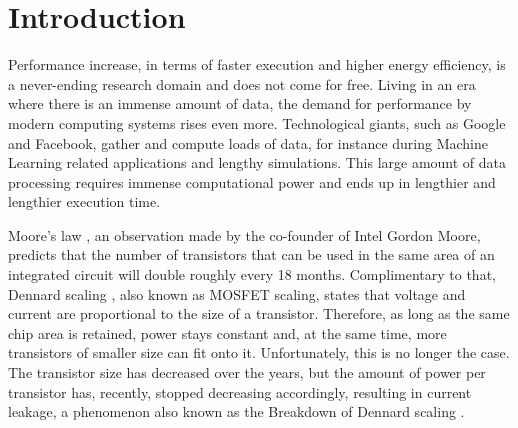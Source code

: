 \documentclass[]{usiinfthesis}
\begin{document}
\tableofcontents 

\mainmatter

%
%
%  
%
%
%

\chapter*{Introduction}

Performance increase, in terms of faster execution and higher energy efficiency, 
is a never-ending research domain and does not come for free.
Living in an era where there is an immense amount of data, the demand for %
performance by modern computing systems rises even more.
Technological giants, such as Google and Facebook, gather and compute loads of data, for instance 
during Machine Learning related applications and lengthy simulations. This large amount of data
processing requires immense computational power and ends up in lengthier and lengthier execution
 time.\par

Moore's law \cite{schaller1997moore}, an observation made by the co-founder of Intel Gordon Moore, 
predicts that the number of transistors that can be used in the same area of an integrated 
circuit will double roughly every 18 months. Complimentary to that, Dennard scaling 
\cite{dennard1974design}, 
also known as MOSFET scaling, states that voltage and current are 
proportional to the size of a transistor. Therefore, as long as the same chip area is retained, 
power stays constant and, at the same time, more transistors of smaller size can fit onto it.
Unfortunately, this is no longer the case. The transistor size has decreased over 
the years, but the amount of power per transistor has, recently, stopped decreasing accordingly,  
resulting in current leakage, a phenomenon also known as the 
Breakdown of Dennard scaling \cite{esmaeilzadeh2011dark}.\par
\end{document}
